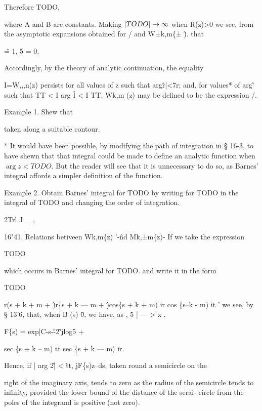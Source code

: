 Therefore TODO,

where A and B are constants. Making $\left| TODO \right| \rightarrow \infty$ when R(z)>0 we see, from 
the asymptotic expansions obtained for / and W±k,m\{± \^). that 

\^ = 1, 5 = 0. 

Accordingly, by the theory of analytic continuation, the equality 

I=W,,,n(z) 
persists for all values of z such that arg\^r|<7r; and, for values* of arg\^' 
such that TT < I arg \^ I < I TT, Wk,m (z) may be defined to be the expression /. 

Example 1. Shew that 

taken along a suitable contour. 

* It would have been possible, by modifying the path of integration in § 16-3, to have shewn 
that that integral could be made to define an analytic function when
$\arg z < TODO$. But the 
reader will see that it is unnecessary to do so, as Barnes' integral affords a simpler definition 
of the function. 



%
%



Example 2. Obtain Barnes' integral for TODO by writing 
for TODO in the integral of TODO and changing the order of integration. 



2Trl J \_ , 



16"41. Relations betiveen Wk,m\{z) '-\^nd Mk,±m\{z)- 
If we take the expression 

TODO

which occurs in Barnes' integral for TODO. and write it in the form 

TODO

r(s + k + m + \^)r\{s + k — m + \^)cos\{s + k + m) ir cos \{s--k - m) it ' 
we see, by § 13'6, that, when B (s) \^ 0, we have, as , 5 | — > x , 



F\{s) = exp|C-s-\^-2\^'jlog5 + 



sec \{s + k -- m) tt sec \{s + k — m) ir. 



Hence, if | arg 2\^ | < \^ tt, jF\{s)z--ds, taken round a semicircle on the 

right of the imaginary axis, tends to zero as the radius of the semicircle 
tends to infinity, provided the lower bound of the distance of the serai- 
circle from the poles of the integrand is positive (not zero). 

